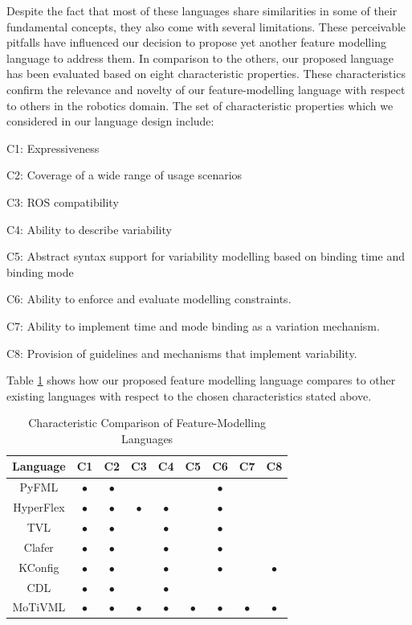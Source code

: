 \documentclass[conference]{IEEEtran}
\begin{document}
Despite the fact that most of these languages share similarities in some of their fundamental concepts, they also come with several limitations. These perceivable pitfalls have influenced our decision to propose yet another feature modelling language to address them. In comparison to the others, our proposed language has been evaluated based on eight characteristic properties. These characteristics confirm the relevance and novelty of our feature-modelling language with respect to others in the robotics domain. The set of characteristic properties which we considered in our language design include:
\begin{enumerate*}[label=(\roman*)]
	\item C1: Expressiveness
	\item C2: Coverage of a wide range of usage scenarios
	\item C3: ROS compatibility
	\item C4: Ability to describe variability
	\item C5: Abstract syntax support for variability modelling based on binding time and binding mode
	\item C6: Ability to enforce and evaluate modelling constraints.
	\item C7: Ability to implement time and mode binding as a variation mechanism.
	\item C8: Provision of guidelines and mechanisms that implement variability.
\end{enumerate*}

Table \ref{tab:compfml} shows how our proposed feature modelling language compares to other existing languages with respect to the chosen characteristics stated above.
\begin{table}[H]
\caption{Characteristic Comparison of Feature-Modelling Languages}
\begin{center}
\begin{tabular}{c c c c c c c c c}
\hline
    Language & C1 & C2 & C3 & C4 & C5 & C6 & C7 & C8 \\ \hline
    PyFML & $\bullet$ & $\bullet$ &  &  & & $\bullet$ & &\\\hline
    HyperFlex & $\bullet$ & $\bullet$ & $\bullet$ & $\bullet$ &  & $\bullet$ & &\\\hline
    TVL & $\bullet$ & $\bullet$ &  & $\bullet$ & & $\bullet$ & &\\ \hline
    Clafer & $\bullet$ & $\bullet$ &  & $\bullet$ &  & $\bullet$ & &\\ \hline
    KConfig & $\bullet$ & $\bullet$ & & $\bullet$ &  & $\bullet$ & & $\bullet$\\ \hline
    CDL & $\bullet$ & $\bullet$ &  &  $\bullet$ &  & & &\\ \hline
    MoTiVML & $\bullet$ & $\bullet$ & $\bullet$ & $\bullet$ & $\bullet$ & $\bullet$ & $\bullet$ & $\bullet$\\ \hline
\end{tabular}
\label{tab:compfml}
\end{center}
\end{table}
\end{document}
